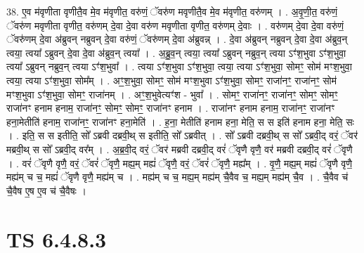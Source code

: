 \documentclass[17pt]{extarticle}
\begin{document}
38. ए॒व म॑वृणीता वृणीतै॒व मे॒व म॑वृणीत॒ वरु॑णं॒ ॅवरु॑ण मवृणीतै॒व मे॒व म॑वृणीत॒ वरु॑णम् । . अ॒वृ॒णी॒त॒ वरु॑णं॒ ॅवरु॑ण मवृणीता वृणीत॒ वरु॑णम् दे॒वा दे॒वा वरु॑ण मवृणीता वृणीत॒ वरु॑णम् दे॒वाः । . वरु॑णम् दे॒वा दे॒वा वरु॑णं॒ ॅवरु॑णम् दे॒वा अ॑ब्रुवन् नब्रुवन् दे॒वा वरु॑णं॒ ॅवरु॑णम् दे॒वा अ॑ब्रुवन्न् । . दे॒वा अ॑ब्रुवन् नब्रुवन् दे॒वा दे॒वा अ॑ब्रुव॒न् त्वया॒ त्वया᳚ ऽब्रुवन् दे॒वा दे॒वा अ॑ब्रुव॒न् त्वया᳚ । . अ॒ब्रु॒व॒न् त्वया॒ त्वया᳚ ऽब्रुवन् नब्रुव॒न् त्वया ऽꣳ॑श॒भुवा ऽꣳ॑श॒भुवा॒ त्वया᳚ ऽब्रुवन् नब्रुव॒न् 
त्वया ऽꣳ॑श॒भुवा᳚ । . त्वया ऽꣳ॑श॒भुवा ऽꣳ॑श॒भुवा॒ त्वया॒ त्वया ऽꣳ॑श॒भुवा॒ सोमꣳ॒॒ सोम॑ मꣳश॒भुवा॒ 
त्वया॒ त्वया ऽꣳ॑श॒भुवा॒ सोम᳚म् । . अꣳ॒॒श॒भुवा॒ सोमꣳ॒॒ सोम॑ मꣳश॒भुवा ऽꣳ॑श॒भुवा॒ सोमꣳ॒॒ राजा॑नꣳ॒॒ राजा॑नꣳ॒॒ सोम॑ मꣳश॒भुवा ऽꣳ॑श॒भुवा॒ सोमꣳ॒॒ राजा॑नम् । . अꣳ॒॒श॒भुवेत्यꣳ॑श - भुवा᳚ । . सोमꣳ॒॒ राजा॑नꣳ॒॒ राजा॑नꣳ॒॒ सोमꣳ॒॒ सोमꣳ॒॒ राजा॑नꣳ हनाम हनाम॒ राजा॑नꣳ॒॒ सोमꣳ॒॒ सोमꣳ॒॒ राजा॑नꣳ हनाम । . राजा॑नꣳ हनाम हनाम॒ राजा॑नꣳ॒॒ राजा॑नꣳ हना॒मेतीति॑ हनाम॒ राजा॑नꣳ॒॒ राजा॑नꣳ हना॒मेति॑ । . ह॒ना॒ मेतीति॑ हनाम हना॒ मेति॒ स स इति॑ हनाम हना॒ मेति॒ सः । . इति॒ स स इतीति॒ सो᳚ ऽब्रवी दब्रवी॒थ् स इतीति॒ सो᳚ ऽब्रवीत् । . सो᳚ ऽब्रवी दब्रवी॒थ् स सो᳚ ऽब्रवी॒द् वरं॒ ॅवर॑ मब्रवी॒थ् स सो᳚ ऽब्रवी॒द् वर᳚म् । . अ॒ब्र॒वी॒द् वरं॒ ॅवर॑ मब्रवी दब्रवी॒द् वरं॑ ॅवृणै वृणै॒ वर॑ मब्रवी दब्रवी॒द् वरं॑ ॅवृणै । . वरं॑ ॅवृणै वृणै॒ वरं॒ ॅवरं॑ ॅवृणै॒ मह्य॒म् मह्यं॑ ॅवृणै॒ वरं॒ ॅवरं॑ ॅवृणै॒ मह्य᳚म् । . वृ॒णै॒ मह्य॒म् मह्यं॑ ॅवृणै वृणै॒ मह्य॑म् च च॒ मह्यं॑ ॅवृणै वृणै॒ मह्य॑म् च । . मह्य॑म् च च॒ मह्य॒म् मह्य॑म् चै॒वैव च॒ मह्य॒म् मह्य॑म् चै॒व । . चै॒वैव च॑ चै॒वैष ए॒ष ए॒व च॑ चै॒वैषः । \newline
\pagebreak
{}

\section{ TS 6.4.8.3 }
\end{document}

